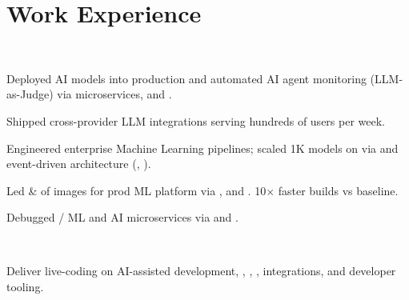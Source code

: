 \documentclass{tex/deedy-resume-openfont}
\begin{document}
\hfill
\begin{minipage}[t]{0.67\textwidth} 


\section{Work Experience}
\\
\vspace{\topsep}
\begin{tightemize}
    \item Deployed AI models into production and automated AI agent monitoring (LLM-as-Judge) via  microservices,  and .
    \item Shipped cross-provider LLM integrations serving hundreds of users per week.
    \item Engineered enterprise Machine Learning pipelines; scaled 1K models on  via  and event-driven architecture (, ).
    \item Led  \&  of  images for prod ML platform via ,  and . 10$\times$ faster builds vs baseline.
    \item Debugged / ML and AI microservices via  and .
\end{tightemize}
\sectionsep

\\
\begin{tightemize}
    \item Deliver live-coding on AI-assisted development, , , , integrations, and developer tooling.
\end{tightemize}
\sectionsep


\end{minipage}
\end{document}

